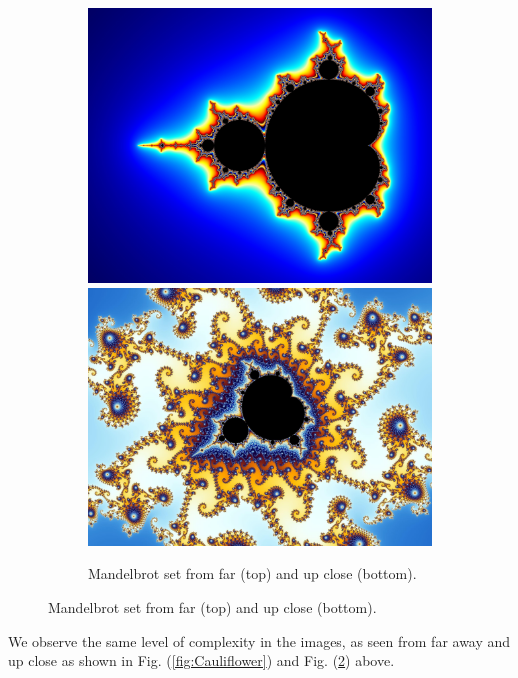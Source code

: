 \documentclass[a4paper,12pt]{article}
\begin{document}
\begin{figure}[h]
{\begin{minipage}{.8\textwidth}
            \begin{subfigure}[b]{0.485\textwidth}
                \centering
                \includegraphics[width=\textwidth]{Mandelbrot_far.jpg}
                \includegraphics[width=\textwidth]{Mandelbrot_close.jpg}
                \caption{Mandelbrot set from far (top) and up close (bottom).}
                \label{fig:Mandelbrot}
            \end{subfigure}
            
        \end{minipage}%
    }
\end{figure}

\par We observe the same level of complexity in the images, as seen from far away 
and up close as shown in Fig. (\ref{fig:Cauliflower}) and Fig. (\ref{fig:Mandelbrot}) above.
\end{document}
